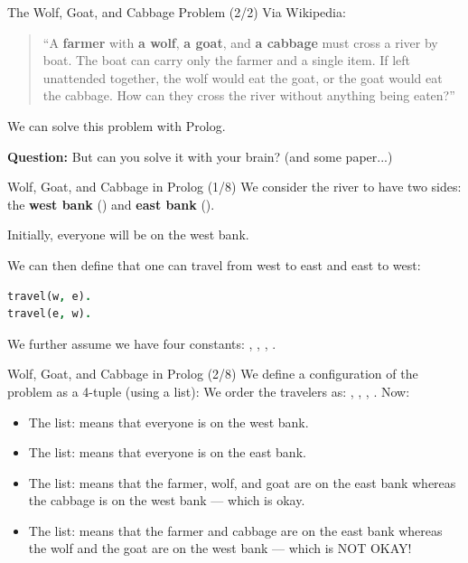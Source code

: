 \begin{frame}{The Wolf, Goat, and Cabbage Problem (2/2)}
Via Wikipedia:

\bigskip

\begin{quote}
``A \textbf{farmer} with \textbf{a wolf}, \textbf{a goat}, and \textbf{a
cabbage} must cross a river by boat. The boat can carry only the farmer and a
single item. If left unattended together, the wolf would eat the goat, or the
goat would eat the cabbage. How can they cross the river without anything being
eaten?''
\end{quote}

\bigskip

We can solve this problem with Prolog. 

\pause

\textbf{Question:} But can you solve it with your brain? (and some paper...)
\end{frame}

\begin{frame}[fragile]{Wolf, Goat, and Cabbage in Prolog (1/8)}
We consider the river to have two sides: the \textbf{west bank} () and
\textbf{east bank} ().

Initially, everyone will be on the west bank.

We can then define that one can travel from west to east and east to west:

\begin{lstlisting}[language=prolog, xleftmargin=0.5cm]
travel(w, e). 
travel(e, w).
\end{lstlisting}

We further assume we have four constants: , ,
, .
\end{frame}

\begin{frame}[fragile]{Wolf, Goat, and Cabbage in Prolog (2/8)}
We define a configuration of the problem as a 4-tuple (using a list):
%
We order the travelers as: , , ,
. Now:
%
\begin{itemize}
    \item The list: \Code{[w, w, w, w]} means that everyone is on the west bank.
    \item The list: \Code{[e, e, e, e]} means that everyone is on the east bank.
    \item The list: \Code{[e, e, e, w]} means that the farmer, wolf, and goat are
    on the east bank whereas the cabbage is on the west bank --- which is okay.
    \item The list: \Code{[e, w, w, e]} means that the farmer and cabbage are on
    the east bank whereas the wolf and the goat are on the west bank --- which is
    NOT OKAY!
\end{itemize}
\end{frame}
    
